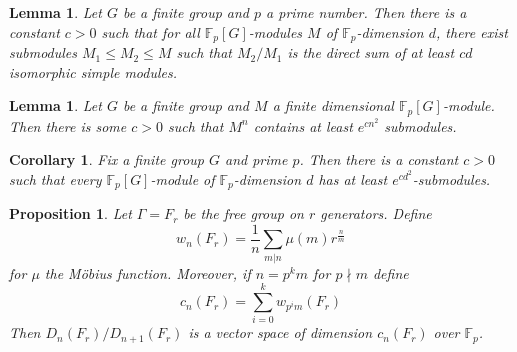 \documentclass[10pt,a4paper]{amsart}
\newtheorem{lemma}[theorem]{Lemma}
\newtheorem{corollary}[theorem]{Corollary}
\newtheorem{proposition}[theorem]{Proposition}
\begin{document}
\setcounter{section}{2}
\setcounter{equation}{0}
\setcounter{theorem}{2}
\begin{lemma}
    Let $G$ be a finite group and $p$ a prime number. Then there is a constant $c > 0$ such that for all $\mathbb{F}_p[G]$-modules $M$ of $\mathbb{F}_p$-dimension $d$, there exist submodules $M_1 \leq M_2 \leq M$ such that $M_2 / M_1$ is the direct sum of at least $cd$ isomorphic simple modules.
\end{lemma}
\begin{lemma}
    Let $G$ be a finite group and $M$ a finite dimensional $\mathbb{F}_p[G]$-module. Then there is some $c>0$ such that $M^n$ contains at least $e^{cn^2}$ submodules.
\end{lemma}

\setcounter{section}{2}
\setcounter{equation}{0}
\setcounter{theorem}{4}
\begin{corollary}
\label{Lots of Submodules}
Fix a finite group $G$ and prime $p$. Then there is a constant $c > 0$ such that every $\mathbb{F}_p[G]$-module of $\mathbb{F}_p$-dimension $d$ has at least $e^{cd^2}$-submodules.
\end{corollary}

\setcounter{section}{2}
\setcounter{equation}{0}
\setcounter{theorem}{5}
\begin{proposition}
\label{Zassenhaus dimension computation}
Let $\Gamma = F_r$ be the free group on $r$ generators.
Define
$$w_n(F_r) = \frac{1}{n} \sum_{m | n} \mu(m) r^{\frac{n}{m}}$$
for $\mu$ the Möbius function. Moreover, if $n = p^k m$ for $p \nmid m$ define
$$c_n(F_r) = \sum_{i=0}^kw_{p^im}(F_r)$$
Then $D_n(F_r)/D_{n+1}(F_r)$ is a vector space of dimension $c_n(F_r)$ over $\mathbb{F}_p$.
\end{proposition}
\end{document}
